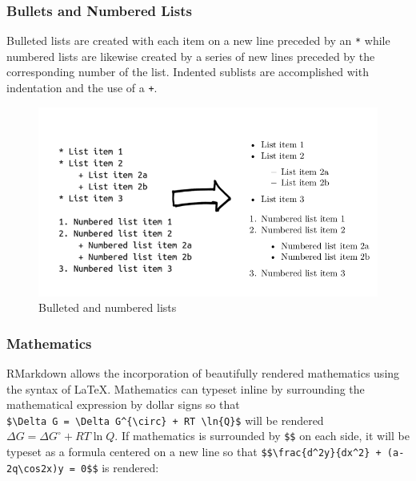 \documentclass[]{elsarticle} %
\begin{document}
\hypertarget{bullets-and-numbered-lists}{%
\subsubsection{Bullets and Numbered
Lists}\label{bullets-and-numbered-lists}}

Bulleted lists are created with each item on a new line preceded by an
\texttt{*} while numbered lists are likewise created by a series of new
lines preceded by the corresponding number of the list. Indented
sublists are accomplished with indentation and the use of a \texttt{+}.

\begin{figure}[H]

{\centering \includegraphics[width=0.9\linewidth,]{Figures/Figure3} 

}

\caption{Bulleted and numbered lists}\label{fig:fig3}
\end{figure}

\hypertarget{mathematics}{%
\subsubsection{Mathematics}\label{mathematics}}

RMarkdown allows the incorporation of beautifully rendered mathematics
using the syntax of LaTeX. Mathematics can typeset inline by surrounding
the mathematical expression by dollar signs so that
\texttt{\$\textbackslash{}Delta\ G\ =\ \textbackslash{}Delta\ G\^{}\{\textbackslash{}circ\}\ +\ RT\ \textbackslash{}ln\{Q\}\$}
will be rendered \(\Delta G = \Delta G^{\circ} + RT \ln{Q}\). If
mathematics is surrounded by \texttt{\$\$} on each side, it will be
typeset as a formula centered on a new line so that
\texttt{\$\$\textbackslash{}frac\{d\^{}2y\}\{dx\^{}2\}\ +\ (a-2q\textbackslash{}cos2x)y\ =\ 0\$\$}
is rendered:
\end{document}

